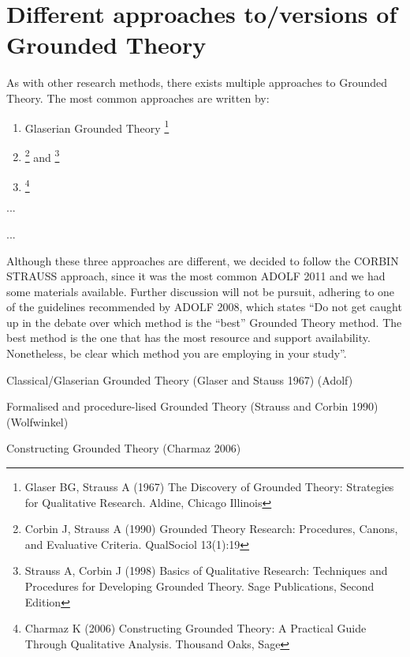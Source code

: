 \section{Different approaches to/versions of Grounded Theory}
As with other research methods, there exists multiple approaches to Grounded Theory.
The most common approaches are written by:
\begin{enumerate}
	\item Glaserian Grounded Theory \footnote{Glaser BG, Strauss A (1967) The Discovery of Grounded Theory: Strategies for Qualitative Research. Aldine, Chicago Illinois}
	\item \footnote{Corbin J, Strauss A (1990) Grounded Theory Research: Procedures, Canons, and Evaluative Criteria. QualSociol 13(1):19} and \footnote{Strauss A, Corbin J (1998) Basics of Qualitative Research: Techniques and Procedures for Developing  Grounded Theory. Sage Publications, Second Edition}
	\item \footnote{Charmaz K (2006) Constructing Grounded Theory: A Practical Guide Through Qualitative Analysis. Thousand Oaks, Sage}
\end{enumerate}

...


...


Although these three approaches are different, we decided to follow the CORBIN STRAUSS approach, since it was the most common ADOLF 2011 and we had some materials available. Further discussion will not be pursuit, adhering to one of the guidelines recommended by ADOLF 2008, which states “Do not get caught up in the debate over which method is the “best” Grounded Theory method. The best method is the one that has the most resource and support availability. Nonetheless, be clear which method you are employing in your study”.
















Classical/Glaserian Grounded Theory (Glaser and Stauss 1967) (Adolf)

Formalised and procedure-lised Grounded Theory (Strauss and Corbin 1990) (Wolfwinkel)

Constructing Grounded Theory (Charmaz 2006)